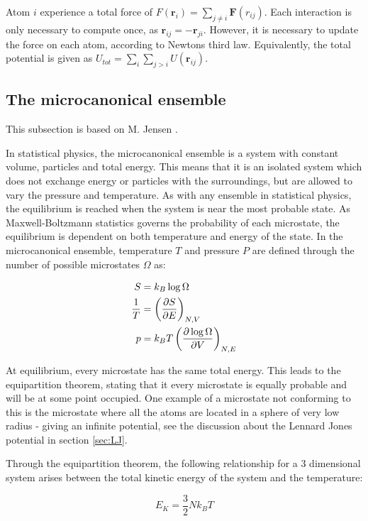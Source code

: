 Atom $ i $ experience a total force of $ F(\textbf{r}_i) =  \sum\limits_{j\neq i}   \textbf{F}(r_{ij})$. Each interaction is only necessary to compute once, as $ \textbf{r}_{ij}  = - \textbf{r}_{ji} $. However, it is necessary to update the force on each atom, according to Newtons third law. Equivalently, the total potential is given as $ U_{tot} =  \sum\limits_{i} \sum\limits_{j>i} 	U(\textbf{r}_{ij}) $. 



\subsection{The microcanonical ensemble}
This subsection is based on M. Jensen \cite{Jensen}. 

In statistical physics, the microcanonical ensemble is a system with constant volume, particles and total energy. This means that it is an isolated system which does not exchange energy or particles  with the surroundings, but are allowed to vary the pressure and temperature. As with any ensemble in statistical physics, the equilibrium is reached when the system is near the most probable state. As Maxwell-Boltzmann statistics governs the probability of each microstate, the equilibrium is dependent on both temperature and energy of the state. In the microcanonical ensemble, temperature $ T $ and pressure $ P $ are defined through the number of possible microstates $ \Omega $ as:

\begin{align}
S &= k_B\log \Omega\\
\frac{1}{T} &= \left(  	\pdv{S}{E}	\right)_{N,V} \label{eq:T}\\
p &= k_BT \left(	\pdv{\log\Omega	}{V}	\right)_{N,E} \label{eq:P}
\end{align}

At equilibrium, every microstate has the same total energy. This leads to  the equipartition theorem, stating that it every microstate is equally probable and will be at some point occupied. One example of a microstate not conforming to this is the microstate where all the atoms are located in a sphere of very low radius - giving an infinite potential, see the discussion about the Lennard Jones potential in section \ref{sec:LJ}. 

Through the equipartition theorem, the following relationship for a 3 dimensional system arises between the total kinetic energy of the system and the temperature:

\begin{equation}\label{eq:equipartition}
E_K = \frac{3	}{2}Nk_BT
\end{equation}

